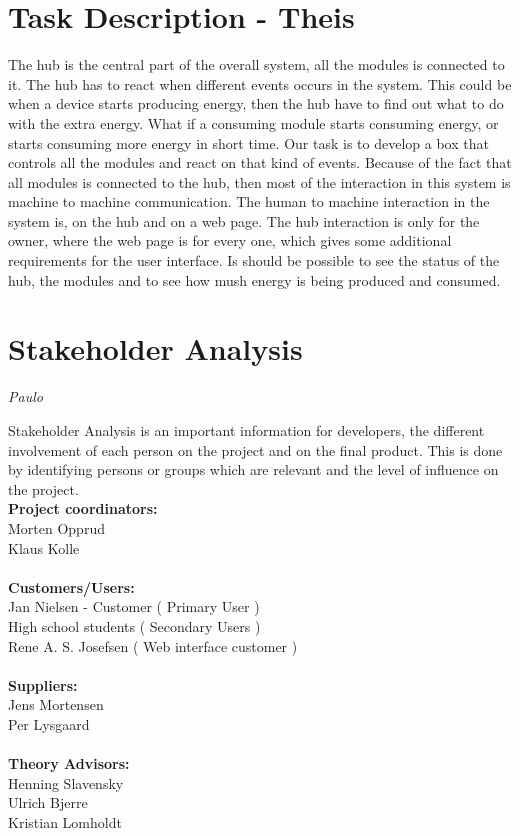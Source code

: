 \section{Task Description - Theis}
The hub is the central part of the overall system, all the modules is connected to it. The hub has to react when different events occurs in the system. This could be when a device starts producing energy, then the hub have to find out what to do with the extra energy. What if a consuming module starts consuming energy, or starts consuming more energy in short time. Our task is to develop a box that controls all the modules and react on that kind of events. Because of the fact that all modules is connected to the hub, then most of the interaction in this system is machine to machine communication. The human to machine interaction in the system is, on the hub and on a web page. The hub interaction is only for the owner, where the web page is for every one, which gives some additional requirements for the user interface. Is should be possible to see the status of the hub, the modules and to see how mush energy is being produced and consumed.

\section{Stakeholder Analysis}
\textit{Paulo}

Stakeholder Analysis is an important information for developers, the different involvement of each person on the project and on the final product. This is done by identifying persons or groups which are relevant and the level of influence on the project.
\\[0.2cm]
\textbf{Project coordinators:}\\ Morten Opprud\\ Klaus Kolle\\
\\
\textbf{Customers/Users:}\\
Jan Nielsen - Customer ( Primary User )\\
High school students ( Secondary Users )\\
Rene A. S. Josefsen ( Web interface customer )\\
\\
\textbf{Suppliers:}\\
Jens Mortensen\\
Per Lysgaard\\
\\
\textbf{Theory Advisors:}\\
Henning Slavensky\\
Ulrich Bjerre\\
Kristian Lomholdt\\

